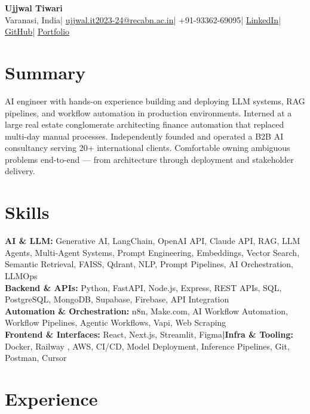 \documentclass[a4paper,10pt]{article}
\begin{document}
 
\begin{center}
{\Large\textbf{Ujjwal Tiwari}}\\[1.5pt]
{\small
Varanasi, India\enspace|\enspace
\href{mailto:ujjwal.it2023-24@recabn.ac.in}{ujjwal.it2023-24@recabn.ac.in}\enspace|\enspace
+91-93362-69095\enspace|\enspace
\href{https://linkedin.com/in/ujjwal-tiwari-b34044341}{LinkedIn}\enspace|\enspace
\href{https://github.com/ujjwaltiwari01}{GitHub}\enspace|\enspace
\href{https://ujjwaltiwari01.netlify.app/}{Portfolio}
}
\end{center}
\vspace{-4pt}
 
\section*{Summary}
{\small
AI engineer with hands-on experience building and deploying LLM systems, RAG pipelines, and workflow automation in production environments. Interned at a large real estate conglomerate architecting finance automation that replaced multi-day manual processes. Independently founded and operated a B2B AI consultancy serving 20+ international clients. Comfortable owning ambiguous problems end-to-end — from architecture through deployment and stakeholder delivery.
}
 
\section*{Skills}
{\small
\textbf{AI \& LLM:} Generative AI, LangChain, OpenAI API, Claude API, RAG, LLM Agents, Multi-Agent Systems, Prompt Engineering, Embeddings, Vector Search, Semantic Retrieval, FAISS, Qdrant, NLP, Prompt Pipelines, AI Orchestration, LLMOps\\[1pt]
\textbf{Backend \& APIs:} Python, FastAPI, Node.js, Express, REST APIs, SQL, PostgreSQL, MongoDB, Supabase, Firebase, API Integration\\[1pt]
\textbf{Automation \& Orchestration:} n8n, Make.com, AI Workflow Automation, Workflow Pipelines, Agentic Workflows, Vapi, Web Scraping\\[1pt]
\textbf{Frontend \& Interfaces:} React, Next.js, Streamlit, Figma\enspace\textbf{|}\enspace\textbf{Infra \& Tooling:} Docker, Railway , AWS, CI/CD, Model Deployment, Inference Pipelines, Git, Postman, Cursor
}
 
\section*{Experience}
 
\end{document}
